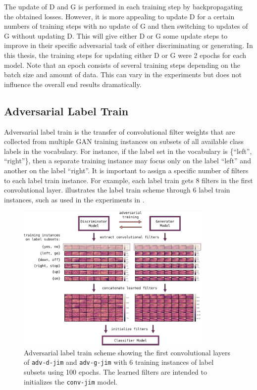 The update of D and G is performed in each training step by backpropagating the obtained losses.
However, it is more appealing to update D for a certain numbers of training steps with no update of G and then switching to updates of G without updating D.
This will give either D or G some update steps to improve in their specific adversarial task of either discriminating or generating.
In this thesis, the training steps for updating either D or G were 2 epochs for each model.
Note that an epoch consists of several training steps depending on the batch size and amount of data.
This can vary in the experiments but does not influence the overall end results dramatically.



\subsection{Adversarial Label Train}
Adversarial label train is the transfer of convolutional filter weights that are collected from multiple GAN training instances on subsets of all available class labels in the vocabulary.
For instance, if the label set in the vocabulary is \{\enquote{left}, \enquote{right}\}, then a separate training instance may focus only on the label \enquote{left} and another on the label \enquote{right}.
It is important to assign a specific number of filters to each label train instance.
For example, each label train gets 8 filters in the first convolutional layer.
 illustrates the label train scheme through 6 label train instances, such as used in the experiments in .
\begin{figure}[!ht]
  \centering
    \includegraphics[width=0.85\textwidth]{./4_nn/figs/nn_adv_label_scheme.pdf}
  \caption{Adversarial label train scheme showing the first convolutional layers of \texttt{adv-d-jim} and \texttt{adv-g-jim} with 6 training instances of label subsets using 100 epochs. The learned filters are intended to initializes the \texttt{conv-jim} model.}
  \label{fig:nn_adv_label_scheme}
\end{figure}
